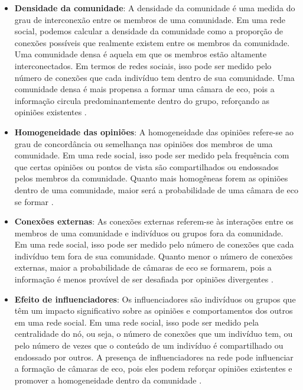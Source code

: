 \begin{itemize}
	\item \textbf{Densidade da comunidade}: A densidade da comunidade é uma medida do grau de interconexão entre os membros de uma comunidade. Em uma rede social, podemos calcular a densidade da comunidade como a proporção de conexões possíveis que realmente existem entre os membros da comunidade. Uma comunidade densa é aquela em que os membros estão altamente interconectados. Em termos de redes sociais, isso pode ser medido pelo número de conexões que cada indivíduo tem dentro de sua comunidade. Uma comunidade densa é mais propensa a formar uma câmara de eco, pois a informação circula predominantemente dentro do grupo, reforçando as opiniões existentes \cite{2015_Recuero_BOOK}.

	\item \textbf{Homogeneidade das opiniões}: A homogeneidade das opiniões refere-se ao grau de concordância ou semelhança nas opiniões dos membros de uma comunidade. Em uma rede social, isso pode ser medido pela frequência com que certas opiniões ou pontos de vista são compartilhados ou endossados pelos membros da comunidade. Quanto mais homogêneas forem as opiniões dentro de uma comunidade, maior será a probabilidade de uma câmara de eco se formar \cite{2016_WanYu}.

	\item \textbf{Conexões externas}: As conexões externas referem-se às interações entre os membros de uma comunidade e indivíduos ou grupos fora da comunidade. Em uma rede social, isso pode ser medido pelo número de conexões que cada indivíduo tem fora de sua comunidade. Quanto menor o número de conexões externas, maior a probabilidade de câmaras de eco se formarem, pois a informação é menos provável de ser desafiada por opiniões divergentes \cite{ref3}.

	\item \textbf{Efeito de influenciadores}: Os influenciadores são indivíduos ou grupos que têm um impacto significativo sobre as opiniões e comportamentos dos outros em uma rede social. Em uma rede social, isso pode ser medido pela centralidade do nó, ou seja, o número de conexões que um indivíduo tem, ou pelo número de vezes que o conteúdo de um indivíduo é compartilhado ou endossado por outros. A presença de influenciadores na rede pode influenciar a formação de câmaras de eco, pois eles podem reforçar opiniões existentes e promover a homogeneidade dentro da comunidade \cite{2014_Gilbuena}.
\end{itemize}

